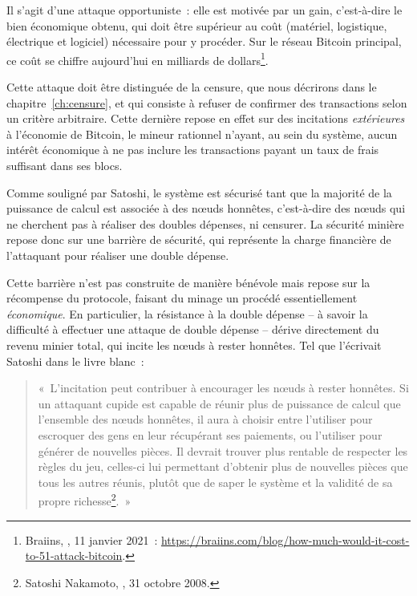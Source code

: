 Il s'agit d'une attaque opportuniste~: elle est motivée par un gain, c'est-à-dire le bien économique obtenu, qui doit être supérieur au coût (matériel, logistique, électrique et logiciel) nécessaire pour y procéder. Sur le réseau Bitcoin principal, ce coût se chiffre aujourd'hui en milliards de dollars\footnote{Braiins, , 11 janvier 2021~: \url{https://braiins.com/blog/how-much-would-it-cost-to-51-attack-bitcoin}.}.

Cette attaque doit être distinguée de la censure, que nous décrirons dans le chapitre~\ref{ch:censure}, et qui consiste à refuser de confirmer des transactions selon un critère arbitraire. Cette dernière repose en effet sur des incitations \emph{extérieures} à l'économie de Bitcoin, le mineur rationnel n'ayant, au sein du système, aucun intérêt économique à ne pas inclure les transactions payant un taux de frais suffisant dans ses blocs.


Comme souligné par Satoshi, le système est sécurisé tant que la majorité de la puissance de calcul est associée à des nœuds honnêtes, c'est-à-dire des nœuds qui ne cherchent pas à réaliser des doubles dépenses, ni censurer. La sécurité minière repose donc sur une barrière de sécurité, qui représente la charge financière de l'attaquant pour réaliser une double dépense.

Cette barrière n'est pas construite de manière bénévole mais repose sur la récompense du protocole, faisant du minage un procédé essentiellement \emph{économique}. En particulier, la résistance à la double dépense -- à savoir la difficulté à effectuer une attaque de double dépense -- dérive directement du revenu minier total, qui incite les nœuds à rester honnêtes. Tel que l'écrivait Satoshi dans le livre blanc~:

\begin{quote}
«~L'incitation peut contribuer à encourager les nœuds à rester honnêtes. Si un attaquant cupide est capable de réunir plus de puissance de calcul que l'ensemble des nœuds honnêtes, il aura à choisir entre l'utiliser pour escroquer des gens en leur récupérant ses paiements, ou l'utiliser pour générer de nouvelles pièces. Il devrait trouver plus rentable de respecter les règles du jeu, celles-ci lui permettant d'obtenir plus de nouvelles pièces que tous les autres réunis, plutôt que de saper le système et la validité de sa propre richesse\footnote{Satoshi Nakamoto, , 31 octobre 2008.}.~»
\end{quote}

